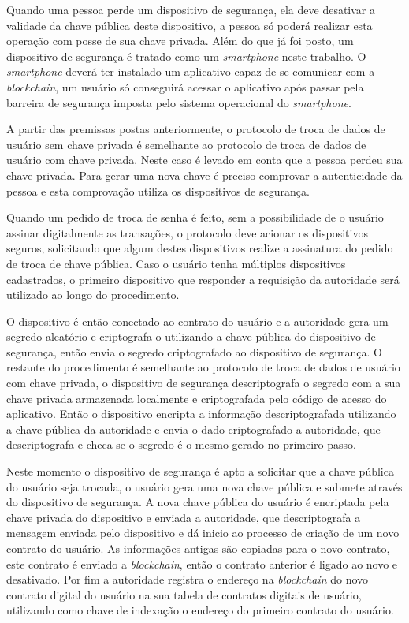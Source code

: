 \documentclass[tcc,capa]{texufpel}
\begin{document}
        Quando uma pessoa perde um dispositivo de segurança, ela deve desativar a validade da chave pública deste dispositivo, a pessoa só poderá realizar esta operação com posse de sua chave privada. Além do que já foi posto, um dispositivo de segurança é tratado como um \textit{smartphone} neste trabalho. O \textit{smartphone} deverá ter instalado um aplicativo capaz de se comunicar com a \textit{blockchain}, um usuário só conseguirá acessar o aplicativo após passar pela barreira de segurança imposta pelo sistema operacional do \textit{smartphone}.
        
        A partir das premissas postas anteriormente, o protocolo de troca de dados de usuário sem chave privada é semelhante ao protocolo de troca de dados de usuário com chave privada. Neste caso é levado em conta que a pessoa perdeu sua chave privada. Para gerar uma nova chave é preciso comprovar a autenticidade da pessoa e esta comprovação utiliza os dispositivos de segurança.
        
        Quando um pedido de troca de senha é feito, sem a possibilidade de o usuário assinar digitalmente as transações, o protocolo deve acionar os dispositivos seguros, solicitando que algum destes dispositivos realize a assinatura do pedido de troca de chave pública. Caso o usuário tenha múltiplos dispositivos cadastrados, o primeiro dispositivo que responder a requisição da autoridade será utilizado ao longo do procedimento.
        
        O dispositivo é então conectado ao contrato do usuário e a autoridade gera um segredo aleatório e criptografa-o utilizando a chave pública do dispositivo de segurança, então envia o segredo criptografado ao dispositivo de segurança. O restante do procedimento é semelhante ao protocolo de troca de dados de usuário com chave privada, o dispositivo de segurança descriptografa o segredo com a sua chave privada armazenada localmente e criptografada pelo código de acesso do aplicativo. Então o dispositivo encripta a informação descriptografada utilizando a chave pública da autoridade e envia o dado criptografado a autoridade, que descriptografa e checa se o segredo é o mesmo gerado no primeiro passo.
        
        Neste momento o dispositivo de segurança é apto a solicitar que a chave pública do usuário seja trocada, o usuário gera uma nova chave pública e submete através do dispositivo de segurança. A nova chave pública do usuário é encriptada pela chave privada do dispositivo e enviada a autoridade, que descriptografa a mensagem enviada pelo dispositivo e dá inicio ao processo de criação de um novo contrato do usuário. As informações antigas são copiadas para o novo contrato, este contrato é enviado a \textit{blockchain}, então o contrato anterior é ligado ao novo e desativado. Por fim a autoridade registra o endereço na \textit{blockchain} do novo contrato digital do usuário na sua tabela de contratos digitais de usuário, utilizando como chave de indexação o endereço do primeiro contrato do usuário.
        
\end{document}
